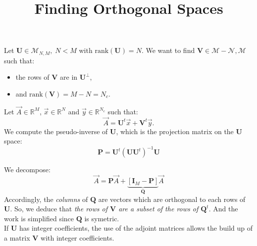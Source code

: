 \documentclass[aps,onecolumn,11pt]{revtex4}
\newcommand{\rank}{\mathrm{rank}}
\begin{document}
\title{\Large Finding Orthogonal Spaces}
\maketitle

Let $\bm{U}\in\mathcal{M}_{N,M}, \; N<M$ with $\rank(\bm{U})=N$.
We want to find $\bm{V}\in\mathcal{M-N,M}$ such that:
\begin{itemize}
\item the rows of
$\bm{V}$ are in $\bm{U}^\perp$,
\item and $\rank(\bm{V})=M-N=N_c$.
\end{itemize}

Let $\vec{A}\in\mathbb{R}^M$, $\vec{x}\in\mathbb{R}^N$ and $\vec{y}\in\mathbb{R}^{N_c}$ such that:
\begin{equation}
	\vec{A} = \bm{U}^t \vec{x} + \bm{V}^t \vec{y}.
\end{equation}
We compute the pseudo-inverse of $\bm{U}$, which is the projection matrix on the $\bm{U}$ space:
\begin{equation}
	\bm{P} = \bm{U}^t \left(\bm{U}\bm{U}^t\right)^{-1} \bm{U}
\end{equation}

We decompose:
\begin{equation}
	\vec{A} = \bm{P} \vec{A} + \underbrace{\left[\bm{I}_M - \bm{P} \right]}_{\bm{Q}} \vec{A}
\end{equation}
Accordingly, the \textit{columns} of $\bm{Q}$ are vectors which are orthogonal to each rows of $\bm{U}$.
So, we deduce that \textit{the rows of $\bm{V}$ are a subset of the rows of $\bm{Q}^t$}.
And the work is simplified since $\bm{Q}$ is symetric.
\\
If $\bm{U}$ has integer coefficients, the use of the adjoint matrices allows the build up of
a matrix $\bm{V}$ with integer coefficients.
\end{document}
